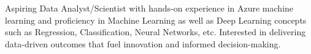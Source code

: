 \documentclass[]{deedy-resume-openfont}
\begin{document}
%
%

%
%
{Aspiring Data Analyst/Scientist with hands-on experience in Azure machine learning and proficiency in Machine Learning as well as Deep Learning concepts such as Regression, Classification, Neural Networks, etc. Interested in delivering data-driven outcomes that fuel innovation and informed decision-making.}
\end{document}
